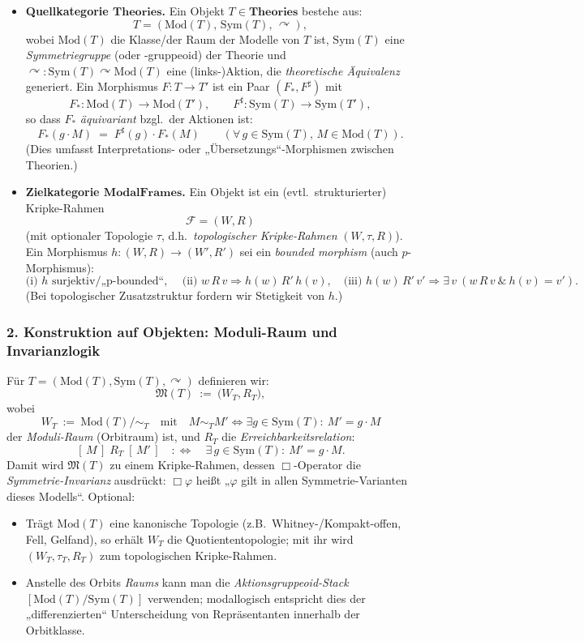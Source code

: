 \documentclass[10pt, letterpaper]{article}
\begin{document}
\begin{itemize}
\item \textbf{Quellkategorie $\mathbf{Theories}$.}
Ein Objekt $T\in\mathbf{Theories}$ bestehe aus:
\[
T=(\mathrm{Mod}(T),\,\mathrm{Sym}(T),\,\curvearrowright),
\]
wobei $\mathrm{Mod}(T)$ die Klasse/der Raum der Modelle von $T$ ist, 
$\mathrm{Sym}(T)$ eine \emph{Symmetriegruppe} (oder -gruppeoid) der Theorie und
$\curvearrowright:\mathrm{Sym}(T)\curvearrowright \mathrm{Mod}(T)$ eine (links-)Aktion, die 
\emph{theoretische Äquivalenz} generiert. 
Ein Morphismus $F:T\to T'$ ist ein Paar $(F_{\!*},F^\sharp)$ mit
\[
F_{\!*}:\mathrm{Mod}(T)\to\mathrm{Mod}(T'),\qquad
F^\sharp:\mathrm{Sym}(T)\to\mathrm{Sym}(T'),
\]
so dass $F_{\!*}$ \emph{äquivariant} bzgl.\ der Aktionen ist:
\[
F_{\!*}(g\cdot M)\;=\;F^\sharp(g)\cdot F_{\!*}(M)\qquad(\forall\,g\in\mathrm{Sym}(T),\,M\in\mathrm{Mod}(T)).
\]
(Dies umfasst Interpretations- oder „Übersetzungs“-Morphismen zwischen Theorien.)

\item \textbf{Zielkategorie $\mathbf{ModalFrames}$.}
Ein Objekt ist ein (evtl.\ strukturierter) Kripke-Rahmen 
\[
\mathcal{F}=(W,R)
\]
(mit optionaler Topologie $\tau$, d.h.\ \emph{topologischer Kripke-Rahmen} $(W,\tau,R)$). 
Ein Morphismus $h:(W,R)\to(W',R')$ sei ein \emph{bounded morphism} (auch $p$-Morphismus):
\[
\text{(i) } h \text{ surjektiv/„p-bounded“, }\quad
\text{(ii) } w\,R\,v \Rightarrow h(w)\,R'\,h(v),\quad
\text{(iii) } h(w)\,R'\,v' \Rightarrow \exists\,v\ (w\,R\,v\ \&\ h(v)=v').
\]
(Bei topologischer Zusatzstruktur fordern wir Stetigkeit von $h$.)
\end{itemize}

\subsubsection*{2. Konstruktion auf Objekten: Moduli-Raum und Invarianzlogik}

Für $T=(\mathrm{Mod}(T),\mathrm{Sym}(T),\curvearrowright)$ definieren wir:
\[
\mathfrak{M}(T)\ :=\ \bigl(W_T,R_T\bigr),
\]
wobei
\[
W_T\ :=\ \mathrm{Mod}(T)/\!\sim_T\quad\text{mit}\quad 
M\sim_T M'\iff \exists g\in\mathrm{Sym}(T):\ M'=g\cdot M
\]
der \emph{Moduli-Raum} (Orbitraum) ist, und $R_T$ die \emph{Erreichbarkeitsrelation}:
\[
[\,M\,]\;R_T\;[\,M'\,] \quad:\Longleftrightarrow\quad
\exists\,g\in\mathrm{Sym}(T):\ M'=g\cdot M.
\]
Damit wird $\mathfrak{M}(T)$ zu einem Kripke-Rahmen, dessen $\Box$-Operator die 
\emph{Symmetrie-Invarianz} ausdrückt: $\Box\varphi$ heißt „$\varphi$ gilt in allen
Symmetrie-Varianten dieses Modells“. Optional:
\begin{itemize}
\item Trägt $\mathrm{Mod}(T)$ eine kanonische Topologie (z.B.\ Whitney-/Kompakt-offen, 
Fell, Gelfand), so erhält $W_T$ die Quotiententopologie; mit ihr wird 
$(W_T,\tau_T,R_T)$ zum topologischen Kripke-Rahmen.
\item Anstelle des Orbits \emph{Raums} kann man die \emph{Aktionsgruppeoid-Stack}
$[\mathrm{Mod}(T)/\mathrm{Sym}(T)]$ verwenden; modallogisch entspricht dies
der „differenzierten“ Unterscheidung von Repräsentanten innerhalb der Orbitklasse.
\end{itemize}
\end{document}
